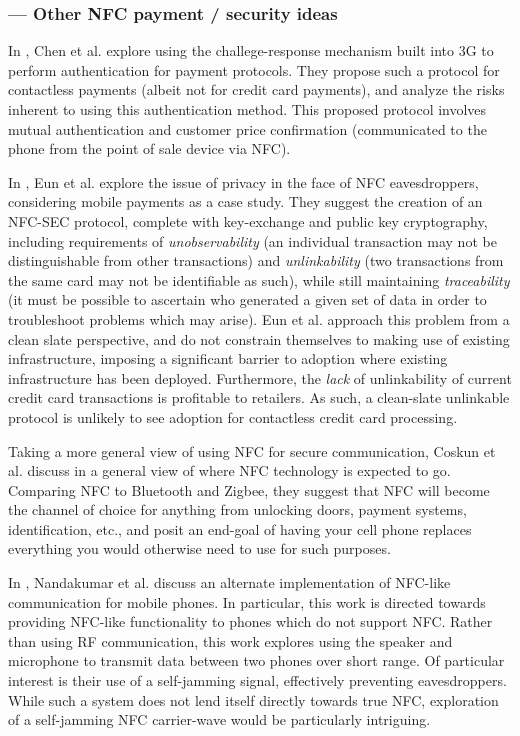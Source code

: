 \subsubsection*{--- Other NFC payment / security ideas}

In \cite{chen2010using}, Chen et al. explore using the challege-response mechanism built into 3G to perform authentication for payment protocols.
They propose such a protocol for contactless payments (albeit not for credit card payments), and analyze the risks inherent to using this authentication method.
This proposed protocol involves mutual authentication and customer price confirmation (communicated to the phone from the point of sale device via NFC).

In \cite{eun2013conditional}, Eun et al. explore the issue of privacy in the face of NFC eavesdroppers, considering mobile payments as a case study.
They suggest the creation of an NFC-SEC protocol, complete with key-exchange and public key cryptography, including requirements of
    \emph{unobservability} (an individual transaction may not be distinguishable from other transactions) and
    \emph{unlinkability} (two transactions from the same card may not be identifiable as such), while still maintaining
    \emph{traceability} (it must be possible to ascertain who generated a given set of data in order to troubleshoot problems which may arise).
Eun et al. approach this problem from a clean slate perspective, and do not constrain themselves to making use of existing infrastructure,
    imposing a significant barrier to adoption where existing infrastructure has been deployed.
Furthermore, the \emph{lack} of unlinkability of current credit card transactions is profitable to retailers.
As such, a clean-slate unlinkable protocol is unlikely to see adoption for contactless credit card processing.

Taking a more general view of using NFC for secure communication,
    Coskun et al. discuss in \cite{Coskun2013} a general view of where NFC technology is expected to go.
Comparing NFC to Bluetooth and Zigbee, they suggest that NFC will become the channel of choice for anything from unlocking doors, payment systems, identification, etc.,
    and posit an end-goal of having your cell phone replaces everything you would otherwise need to use for such purposes.

In \cite{nandakumar2013dhwani}, Nandakumar et al. discuss an alternate implementation of NFC-like communication for mobile phones.
In particular, this work is directed towards providing NFC-like functionality to phones which do not support NFC.
Rather than using RF communication, this work explores using the speaker and microphone to transmit data between two phones over short range.
Of particular interest is their use of a self-jamming signal, effectively preventing eavesdroppers.
While such a system does not lend itself directly towards true NFC, exploration of a self-jamming NFC carrier-wave would be particularly intriguing.
